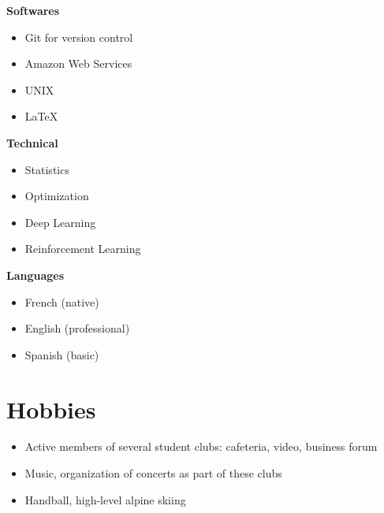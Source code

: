 \documentclass[a4paper,10.5pt]{article}
\begin{document}
\begin{paracol}{2}
\begin{rightcolumn}
			\textbf{Softwares}
			\begin{itemize}
				\item Git for version control
				\item Amazon Web Services
				\item UNIX
				\item \LaTeX
			\end{itemize}
			\vspace{0.2cm}
			
			\textbf{Technical}
			\begin{itemize}
				\item Statistics
				\item Optimization
				\item Deep Learning
				\item Reinforcement Learning
			\end{itemize}
			\vspace{0.2cm}
			
			\textbf{Languages}
			\begin{itemize}
				\item French (native)
				\item English (professional)
				\item Spanish (basic)
			\end{itemize}
		
		\section*{Hobbies}
		\begin{itemize}
			\item Active members of several student clubs: cafeteria, video, business forum
			\item Music, organization of concerts as part of these clubs
			\item Handball, high-level alpine skiing
		\end{itemize}
			
		\end{rightcolumn}
		
	\end{paracol}
	
	
	
	
\end{document}

